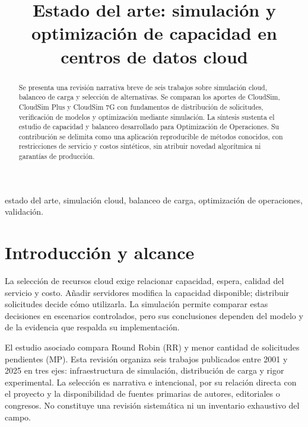 \documentclass[conference,a4paper]{IEEEtran}
\begin{document}
\title{Estado del arte: simulación y optimización de capacidad en centros de datos cloud}
\author{
\and
{}
\and
{}
}
\maketitle
\begin{abstract}
Se presenta una revisión narrativa breve de seis trabajos sobre simulación cloud, balanceo de carga y selección de alternativas. Se comparan los aportes de CloudSim, CloudSim Plus y CloudSim 7G con fundamentos de distribución de solicitudes, verificación de modelos y optimización mediante simulación. La síntesis sustenta el estudio de capacidad y balanceo desarrollado para Optimización de Operaciones. Su contribución se delimita como una aplicación reproducible de métodos conocidos, con restricciones de servicio y costos sintéticos, sin atribuir novedad algorítmica ni garantías de producción.
\end{abstract}
\begin{IEEEkeywords}
estado del arte, simulación cloud, balanceo de carga, optimización de operaciones, validación.
\end{IEEEkeywords}

\section{Introducción y alcance}
La selección de recursos cloud exige relacionar capacidad, espera, calidad del servicio y costo. Añadir servidores modifica la capacidad disponible; distribuir solicitudes decide cómo utilizarla. La simulación permite comparar estas decisiones en escenarios controlados, pero sus conclusiones dependen del modelo y de la evidencia que respalda su implementación.

El estudio asociado compara Round Robin (RR) y menor cantidad de solicitudes pendientes (MP). Esta revisión organiza seis trabajos publicados entre 2001 y 2025 en tres ejes: infraestructura de simulación, distribución de carga y rigor experimental. La selección es narrativa e intencional, por su relación directa con el proyecto y la disponibilidad de fuentes primarias de autores, editoriales o congresos. No constituye una revisión sistemática ni un inventario exhaustivo del campo.
\end{document}
